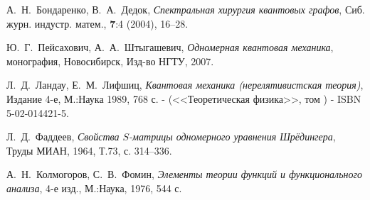 \documentclass[a4 paper, 12 pt]{extarticle}
\newcommand{\RomanNumeralCaps}[1]
{\MakeUppercase{\romannumeral #1}}
\begin{document}
\begin{thebibliography}{1}
	 А.~Н.~Бондаренко, В.~А.~Дедок, {\it Спектральная хирургия квантовых графов}, Сиб. журн. индустр. матем., \textbf{7}:4 (2004), 16--28.
	
	 Ю.~Г.~Пейсахович, А.~А.~Штыгашевич, {\it Одномерная квантовая механика}, монография, Новосибирск, Изд-во НГТУ, 2007.
	
	 Л.~Д.~Ландау, Е.~М.~Лифшиц, {\it Квантовая механика (нерелятивистская теория)}, Издание 4-е, М.:Наука 1989, 768 с. - (<<Теоретическая физика>>, том \RomanNumeralCaps{3}) - ISBN 5-02-014421-5.
	
	 Л.~Д.~Фаддеев, {\it Свойства $S$-матрицы одномерного уравнения Шрёдингера}, Труды МИАН, 1964, Т.73, с. 314--336.
	
	 А.~Н.~Колмогоров, С.~В.~Фомин, {\it Элементы теории функций и функционального анализа}, 4-е изд., М.:Наука, 1976, 544 с.
	
	
	
\end{thebibliography}
\end{document}
